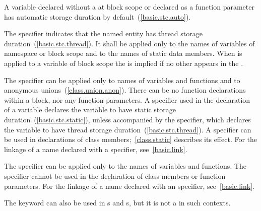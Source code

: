 \pnum
\begin{note}
A variable declared without a 
at block scope or declared as a function parameter
has automatic storage duration by default~(\ref{basic.stc.auto}).
\end{note}

\pnum
The  specifier
indicates that the named entity has thread storage duration~(\ref{basic.stc.thread}). It
shall be applied only
to the names of variables of namespace
or block scope and to the names of static data members.
When  is applied to a variable of block scope the
  is implied if no other
 appears in the
.

\pnum
{}%
The  specifier can be applied only to names of variables and
functions and to anonymous unions~(\ref{class.union.anon}). There can be no
 function declarations within a block, nor any
 function parameters. A  specifier used in
the declaration of a variable declares the variable to have static storage
duration~(\ref{basic.stc.static}), unless accompanied by the
 specifier, which declares the variable to have thread
storage duration~(\ref{basic.stc.thread}). A  specifier can be
used in declarations of class members;~\ref{class.static} describes its
effect.
%
For the linkage of a name declared with a  specifier,
see~\ref{basic.link}.

\pnum
{}%
The  specifier can be applied only to the names of variables
and functions. The  specifier cannot be used in the
declaration of class members or function parameters.
%
%
For the linkage of a name declared with an  specifier,
see~\ref{basic.link}.
\begin{note}
The  keyword can also be used in
s and
s, but it is not a
 in such contexts.
\end{note}

